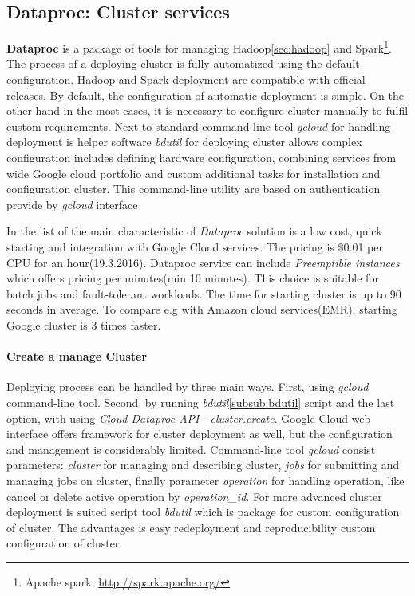 \documentclass[a4paper,12pt,oneside]{report}
\begin{document}
		\subsection{Dataproc: Cluster services}
		\label{subsub:dataproc}
\textbf{Dataproc} is a package of tools for managing Hadoop\ref{sec:hadoop} 
and Spark\footnote{Apache spark: \url{http://spark.apache.org/}}.
The process of a deploying cluster is fully automatized using the default 
configuration. Hadoop and Spark deployment are compatible with official
releases. By default, the configuration of automatic deployment is simple. 
On the other hand in the most cases, it is 
necessary to configure cluster manually to fulfil custom requirements. 
Next to standard command-line tool \textit{gcloud} for handling deployment is helper software \emph{bdutil} for deploying cluster allows complex 
configuration includes 
defining hardware configuration, combining services from wide Google cloud 
portfolio and custom additional tasks for installation and configuration cluster. This command-line utility are based on authentication provide by \textit{gcloud} interface

In the list of the main characteristic of \textit{Dataproc} solution is a 
low cost, quick starting and integration with Google Cloud services. 
The pricing is  \$0.01 per CPU for an hour(19.3.2016). Dataproc service can 
include \textit{Preemptible instances} which offers pricing 
per minutes(min 10 minutes). This choice is suitable for batch jobs and 
fault-tolerant workloads. The time for starting cluster is up to 
90 seconds in average. To compare e.g with Amazon cloud services(EMR)\cite{amazon_emr}, 
starting Google cluster is 3 times faster.

\paragraph{Create a manage Cluster} Deploying process can be handled by three main 
ways. First, using \textit{gcloud} command-line tool. Second, by running \textit{bdutil}\ref{subsub:bdutil} script and the last option, with using 
\textit{Cloud Dataproc API} - \textit{cluster.create}. Google Cloud web interface offers framework for cluster deployment as well, but the configuration and 
management is considerably limited. 
Command-line tool \textit{gcloud} consist parameters: \textit{cluster} for managing and 
describing cluster, \textit{jobs} for submitting 
and managing jobs on cluster, finally parameter \textit{operation} for handling operation, 
like cancel or delete active
 operation by \emph{operation\_id}. For more advanced cluster deployment is suited script 
 tool \textit{bdutil} which is 
 package for custom configuration of cluster. The advantages is easy redeployment and 
 reproducibility custom
  configuration of cluster. 
\end{document}
